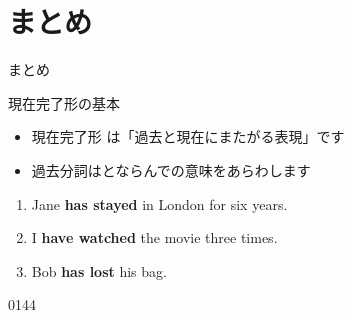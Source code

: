 \documentclass[aspectratio=169,xcolor={dvipsnames,table}]{beamer}
\newcommand{\myaudio}[1]{\href{#1}{\faVolumeUp}}
\begin{document}
\section{まとめ}
\begin{frame}[plain]{まとめ}


 \begin{block}{現在完了形の基本}
\small
\begin{itemize}[square]
 \item  現在完了形\,\,は「過去と現在にまたがる表現」です
 \item 過去分詞はとならんでの意味をあらわします
\end{itemize}
      \end{block}

\begin{enumerate}
 \item Jane \textcolor{NavyBlue}{\bfseries has stayed} in London for six years.
 \item I \textcolor{NavyBlue}{\bfseries have watched} the movie three times.
 \item Bob \textcolor{NavyBlue}{\bfseries has lost} his bag.
\end{enumerate}

\mbox{}\hfill{\tiny 0144}\,{\scriptsize \myaudio{./audio/011_have_pp_intro_06.mp3}}
\end{frame}
\end{document}

